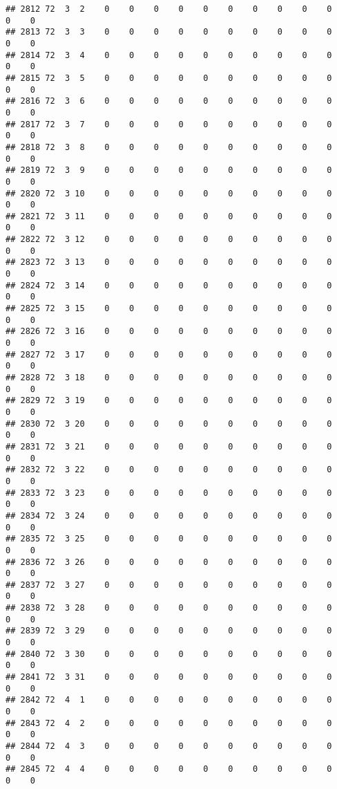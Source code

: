 \documentclass[]{article}
\begin{document}
\begin{verbatim}
## 2812 72  3  2    0    0    0    0    0    0    0    0    0    0    0    0
## 2813 72  3  3    0    0    0    0    0    0    0    0    0    0    0    0
## 2814 72  3  4    0    0    0    0    0    0    0    0    0    0    0    0
## 2815 72  3  5    0    0    0    0    0    0    0    0    0    0    0    0
## 2816 72  3  6    0    0    0    0    0    0    0    0    0    0    0    0
## 2817 72  3  7    0    0    0    0    0    0    0    0    0    0    0    0
## 2818 72  3  8    0    0    0    0    0    0    0    0    0    0    0    0
## 2819 72  3  9    0    0    0    0    0    0    0    0    0    0    0    0
## 2820 72  3 10    0    0    0    0    0    0    0    0    0    0    0    0
## 2821 72  3 11    0    0    0    0    0    0    0    0    0    0    0    0
## 2822 72  3 12    0    0    0    0    0    0    0    0    0    0    0    0
## 2823 72  3 13    0    0    0    0    0    0    0    0    0    0    0    0
## 2824 72  3 14    0    0    0    0    0    0    0    0    0    0    0    0
## 2825 72  3 15    0    0    0    0    0    0    0    0    0    0    0    0
## 2826 72  3 16    0    0    0    0    0    0    0    0    0    0    0    0
## 2827 72  3 17    0    0    0    0    0    0    0    0    0    0    0    0
## 2828 72  3 18    0    0    0    0    0    0    0    0    0    0    0    0
## 2829 72  3 19    0    0    0    0    0    0    0    0    0    0    0    0
## 2830 72  3 20    0    0    0    0    0    0    0    0    0    0    0    0
## 2831 72  3 21    0    0    0    0    0    0    0    0    0    0    0    0
## 2832 72  3 22    0    0    0    0    0    0    0    0    0    0    0    0
## 2833 72  3 23    0    0    0    0    0    0    0    0    0    0    0    0
## 2834 72  3 24    0    0    0    0    0    0    0    0    0    0    0    0
## 2835 72  3 25    0    0    0    0    0    0    0    0    0    0    0    0
## 2836 72  3 26    0    0    0    0    0    0    0    0    0    0    0    0
## 2837 72  3 27    0    0    0    0    0    0    0    0    0    0    0    0
## 2838 72  3 28    0    0    0    0    0    0    0    0    0    0    0    0
## 2839 72  3 29    0    0    0    0    0    0    0    0    0    0    0    0
## 2840 72  3 30    0    0    0    0    0    0    0    0    0    0    0    0
## 2841 72  3 31    0    0    0    0    0    0    0    0    0    0    0    0
## 2842 72  4  1    0    0    0    0    0    0    0    0    0    0    0    0
## 2843 72  4  2    0    0    0    0    0    0    0    0    0    0    0    0
## 2844 72  4  3    0    0    0    0    0    0    0    0    0    0    0    0
## 2845 72  4  4    0    0    0    0    0    0    0    0    0    0    0    0

\end{verbatim}
\end{document}
